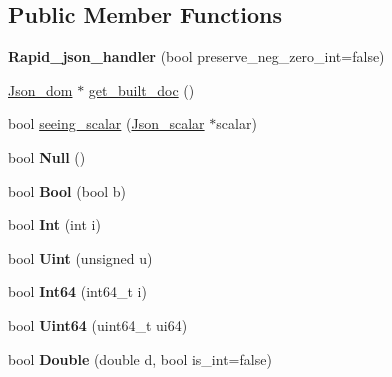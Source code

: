 \subsection*{Public Member Functions}
\begin{DoxyCompactItemize}
\item 
\mbox{\label{classRapid__json__handler_a88ecf846c3faa8240896fd935758b9bf}} 
{\bfseries Rapid\+\_\+json\+\_\+handler} (bool preserve\+\_\+neg\+\_\+zero\+\_\+int=false)
\item 
\mbox{\hyperlink{classJson__dom}{Json\+\_\+dom}} $\ast$ \mbox{\hyperlink{classRapid__json__handler_a8c1594ccddf96f8f8188a37d3e603ef9}{get\+\_\+built\+\_\+doc}} ()
\item 
bool \mbox{\hyperlink{classRapid__json__handler_a6d2c68192aa1482a3094baef19df9229}{seeing\+\_\+scalar}} (\mbox{\hyperlink{classJson__scalar}{Json\+\_\+scalar}} $\ast$scalar)
\item 
\mbox{\label{classRapid__json__handler_a89fbfbcc8a82af741ba85bdca153058e}} 
bool {\bfseries Null} ()
\item 
\mbox{\label{classRapid__json__handler_acd7c612917ee905313e85a24c6c3db47}} 
bool {\bfseries Bool} (bool b)
\item 
\mbox{\label{classRapid__json__handler_a5e8c39afa773c09993fd76d5190cf512}} 
bool {\bfseries Int} (int i)
\item 
\mbox{\label{classRapid__json__handler_abf393cf8c9d1af1f343d3814aeffa570}} 
bool {\bfseries Uint} (unsigned u)
\item 
\mbox{\label{classRapid__json__handler_ac6c109d5bc384f4c860b7ee62fcc5ca3}} 
bool {\bfseries Int64} (int64\+\_\+t i)
\item 
\mbox{\label{classRapid__json__handler_adc98a8d6ea253de9cfb710c69f9909a0}} 
bool {\bfseries Uint64} (uint64\+\_\+t ui64)
\item 
\mbox{\label{classRapid__json__handler_a0deec2dfadcb6943daac2fa825135582}} 
bool {\bfseries Double} (double d, bool is\+\_\+int=false)

\end{DoxyCompactItemize}
